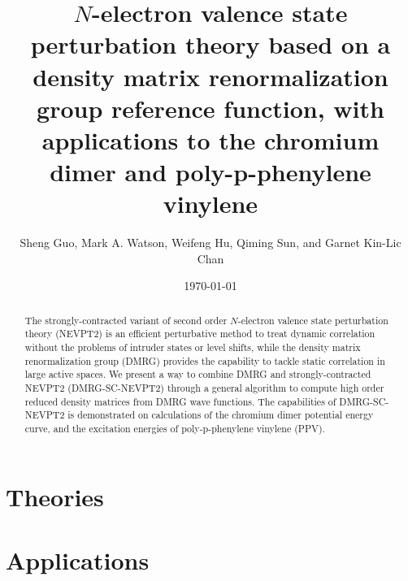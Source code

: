 \documentclass[
 aip,
 jcp,
 numerical,
 reprint, %
]{revtex4-1}
\begin{document}
\title{$N$-electron valence state perturbation theory based on a density matrix renormalization group reference function, with applications to the chromium dimer and 
poly-p-phenylene vinylene}
\author{Sheng Guo, Mark A. Watson, Weifeng Hu, Qiming Sun, and Garnet Kin-Lic Chan}

\begin{abstract}

The strongly-contracted variant of second order $N$-electron valence state perturbation theory (NEVPT2) is an efficient perturbative method to 
treat dynamic correlation without the problems of intruder states or level shifts, while the density matrix renormalization group (DMRG) 
provides the capability to tackle static correlation in large active spaces. 
We present a way to combine DMRG and strongly-contracted NEVPT2 (DMRG-SC-NEVPT2) through a general algorithm to compute high order 
reduced density matrices from DMRG wave functions. The capabilities of DMRG-SC-NEVPT2 is demonstrated on calculations of the chromium dimer 
potential energy curve, and the excitation energies of poly-p-phenylene vinylene (PPV).

\end{abstract}

\date{\today}

\maketitle



\section{Theories}







\section{Applications}










{}
\end{document}
